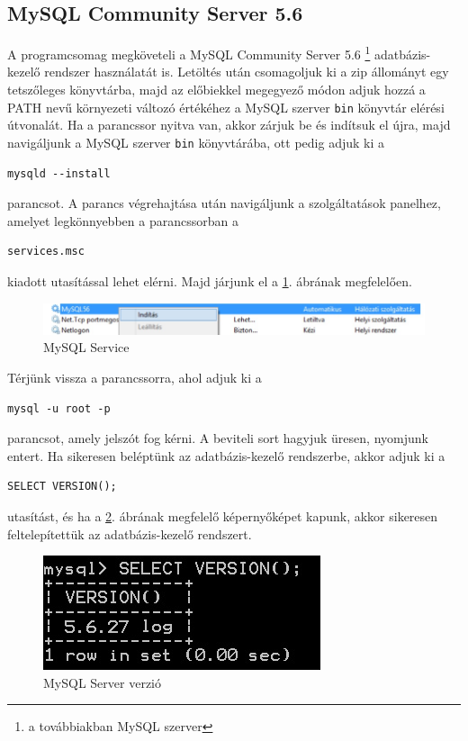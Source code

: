  \subsection{MySQL Community Server 5.6} \label{subsec:mysql_server}
 A programcsomag megköveteli a MySQL Community Server 5.6 \footnote{a továbbiakban MySQL szerver} \cite{mysqlsite} adatbázis-kezelő rendszer használatát is. Letöltés után csomagoljuk ki a zip állományt egy tetszőleges könyvtárba, majd az előbiekkel megegyező módon adjuk hozzá a PATH nevű környezeti változó értékéhez a MySQL szerver \texttt{bin} könyvtár elérési útvonalát. Ha a parancssor nyitva van, akkor zárjuk be és indítsuk el újra, majd navigáljunk a MySQL szerver \texttt{bin} könyvtárába, ott pedig adjuk ki a
 \begin{Verbatim}[xleftmargin=.5in]
mysqld --install
\end{Verbatim}
parancsot. A parancs végrehajtása után navigáljunk a szolgáltatások panelhez, amelyet legkönnyebben a parancssorban a
 \begin{Verbatim}[xleftmargin=.5in]
services.msc
\end{Verbatim}
kiadott utasítással lehet elérni. Majd járjunk el a \ref{fig:mysql_service}. ábrának megfelelően. 

\begin{figure}[h!]
  \caption{MySQL Service}
  \label{fig:mysql_service}
  \centering
    \includegraphics[width=\linewidth]{user-documentation/images/mysql_service.jpg}
\end{figure}
Térjünk vissza a parancssorra, ahol adjuk ki a 
 \begin{Verbatim}[xleftmargin=.5in]
mysql -u root -p
\end{Verbatim}
parancsot, amely jelszót fog kérni. A beviteli sort hagyjuk üresen, nyomjunk entert. Ha sikeresen beléptünk az adatbázis-kezelő rendszerbe, akkor adjuk ki a
 \begin{Verbatim}[xleftmargin=.5in]
SELECT VERSION();
\end{Verbatim}
utasítást, és ha a \ref{fig:mysql_version}. ábrának megfelelő képernyőképet kapunk, akkor sikeresen feltelepítettük az adatbázis-kezelő rendszert.
\begin{figure}[h!]
  \caption{MySQL Server verzió}
  \label{fig:mysql_version}
  \centering
    \includegraphics{user-documentation/images/mysql_version.jpg}
\end{figure}

